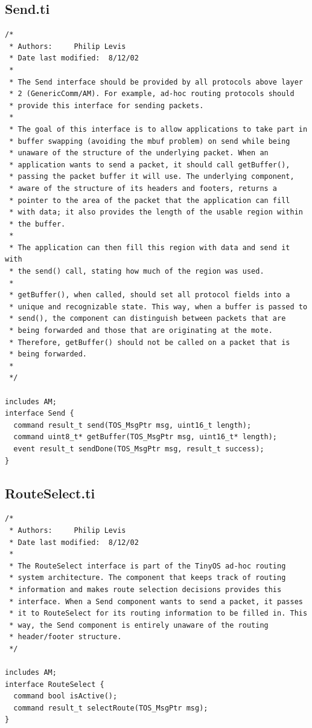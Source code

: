 \documentclass[10pt]{article}
\begin{document}
\subsection*{Send.ti}
\scriptsize
\begin{verbatim}
/*
 * Authors:		Philip Levis
 * Date last modified:  8/12/02
 *
 * The Send interface should be provided by all protocols above layer
 * 2 (GenericComm/AM). For example, ad-hoc routing protocols should
 * provide this interface for sending packets.
 *
 * The goal of this interface is to allow applications to take part in
 * buffer swapping (avoiding the mbuf problem) on send while being
 * unaware of the structure of the underlying packet. When an
 * application wants to send a packet, it should call getBuffer(),
 * passing the packet buffer it will use. The underlying component,
 * aware of the structure of its headers and footers, returns a
 * pointer to the area of the packet that the application can fill
 * with data; it also provides the length of the usable region within
 * the buffer.
 *
 * The application can then fill this region with data and send it with
 * the send() call, stating how much of the region was used.
 *
 * getBuffer(), when called, should set all protocol fields into a
 * unique and recognizable state. This way, when a buffer is passed to
 * send(), the component can distinguish between packets that are
 * being forwarded and those that are originating at the mote.
 * Therefore, getBuffer() should not be called on a packet that is
 * being forwarded.
 *
 */

includes AM;
interface Send { 
  command result_t send(TOS_MsgPtr msg, uint16_t length);
  command uint8_t* getBuffer(TOS_MsgPtr msg, uint16_t* length);
  event result_t sendDone(TOS_MsgPtr msg, result_t success);
}
\end{verbatim}
\normalsize


\subsection*{RouteSelect.ti}
\scriptsize
\begin{verbatim}
/*
 * Authors:		Philip Levis
 * Date last modified:  8/12/02
 *
 * The RouteSelect interface is part of the TinyOS ad-hoc routing
 * system architecture. The component that keeps track of routing
 * information and makes route selection decisions provides this
 * interface. When a Send component wants to send a packet, it passes
 * it to RouteSelect for its routing information to be filled in. This
 * way, the Send component is entirely unaware of the routing
 * header/footer structure.
 */

includes AM;
interface RouteSelect {
  command bool isActive();
  command result_t selectRoute(TOS_MsgPtr msg);
}
\end{verbatim}
\normalsize
\end{document}
